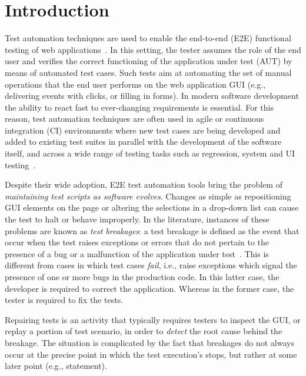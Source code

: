 \section{Introduction}\label{sec:introduction}

Test automation techniques are used to enable the end-to-end (E2E) functional testing of web applications~\cite{DBLP:journals/ac/TonellaRM14}. 
In this setting, the tester assumes the role of the end user and verifies the correct functioning of the application under test (AUT) by means of automated test cases. Such tests aim at automating the set of manual operations that the end user  performs on the web application GUI (e.g., delivering events with clicks, or filling in forms). 
In modern software development the ability to react fast to ever-changing requirements is essential. For this reason, test automation techniques are often used in agile or continuous integration (CI) environments where new test cases are being developed and added to existing test suites in parallel with the development of the software itself, and across a wide range of testing tasks such as regression, system and UI testing~\cite{STVR:STVR121,Fewster,Ramler:2006:EPT:1138929.1138946,Nguyen2014,7381848}.


Despite their wide adoption, E2E test automation tools bring the problem of \textit{maintaining test scripts as software evolves}. Changes as simple as repositioning GUI elements on the page or altering the selections in a drop-down list can cause the test to halt or behave improperly. 
In the literature, instances of these problems are known as \textit{test breakages}: a test breakage is defined as the event that occur when the test raises exceptions or errors that do not pertain to the presence of a bug or a malfunction of the application under test~\cite{Daniel:2011:AGR:2002931.2002937,Daniel:2009:RSR:1747491.1747538,Daniel:2010:TRU:1831708.1831734,Hammoudi-2016-ICST}. 
This is different from cases in which test cases \textit{fail}, i.e., raise exceptions which signal the presence of one or more bugs in the production code. In this latter case, the developer is required to correct the application. Whereas in the former case, the tester is required to fix the tests. %


Repairing tests is an activity that typically requires testers to inspect the GUI, or replay a portion of test scenario, in order to \textit{detect} the root cause behind the breakage. The situation is complicated by the fact that breakages do not always occur at the precise point in which the test execution's stops, but rather at some later point (e.g., statement).

